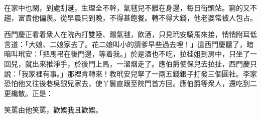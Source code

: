 \begin{myquote}
在家中也閑，到處刮涎，生理全不幹，{}氣毬兒不離在身邊，每日街頭站。窮的又不趨，富貴他偏羨。從早晨只到晚，不得甚飽餐。轉不得大錢，他老婆常被人包占。
\end{myquote}

西門慶正看着衆人在院內打雙陸、踢氣毬，飲酒，只見玳安騎馬來接，悄悄附耳低言道：「大娘、二娘家去了。花二娘叫小的請爹早些過去哩！」這西門慶聽了，暗暗叫玳安：「把馬弔在後門邊，等着我。」於是酒也不吃，拉桂姐到房中，只坐了一回兒，就出來推淨手，於後門上馬，一溜烟走了。應伯爵使保兒去拉扯，西門慶只說：「我家裡有事。」那裡肯轉來！教玳安兒拏了一兩五錢銀子打發三個圓社。李家恐怕他又往後巷吳銀兒家去，使丫鬟直跟至院門首方回。應伯爵等衆人，還吃到二更纔散。正是：

\begin{myquote}
笑罵由他笑罵，歡娛我且歡娛。
\end{myquote}

